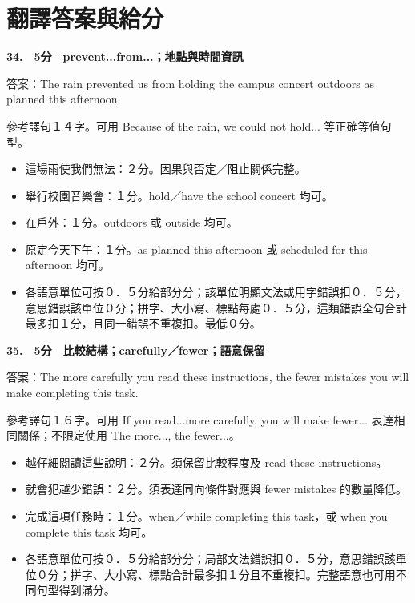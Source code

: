 \documentclass[11pt,a4paper]{article}
\begin{document}
\newpage
\section*{翻譯答案與給分}
\textbf{34.　5分　prevent...from...；地點與時間資訊}\par
答案：The rain prevented us from holding the campus concert outdoors as planned this afternoon.
\par\smallskip
參考譯句１４字。可用 Because of the rain, we could not hold... 等正確等值句型。
\par\smallskip
\begin{itemize}[leftmargin=1.3em,itemsep=2pt,topsep=1pt]
\item 這場雨使我們無法：２分。因果與否定／阻止關係完整。
\item 舉行校園音樂會：１分。hold／have the school concert 均可。
\item 在戶外：１分。outdoors 或 outside 均可。
\item 原定今天下午：１分。as planned this afternoon 或 scheduled for this afternoon 均可。
\item 各語意單位可按０．５分給部分分；該單位明顯文法或用字錯誤扣０．５分，意思錯誤該單位０分；拼字、大小寫、標點每處０．５分，這類錯誤全句合計最多扣１分，且同一錯誤不重複扣。最低０分。
\end{itemize}
\medskip
{}\textbf{35.　5分　比較結構；carefully／fewer；語意保留}\par
答案：The more carefully you read these instructions, the fewer mistakes you will make completing this task.
\par\smallskip
參考譯句１６字。可用 If you read...more carefully, you will make fewer... 表達相同關係；不限定使用 The more..., the fewer...。
\par\smallskip
\begin{itemize}[leftmargin=1.3em,itemsep=2pt,topsep=1pt]
\item 越仔細閱讀這些說明：２分。須保留比較程度及 read these instructions。
\item 就會犯越少錯誤：２分。須表達同向條件對應與 fewer mistakes 的數量降低。
\item 完成這項任務時：１分。when／while completing this task，或 when you complete this task 均可。
\item 各語意單位可按０．５分給部分分；局部文法錯誤扣０．５分，意思錯誤該單位０分；拼字、大小寫、標點合計最多扣１分且不重複扣。完整語意也可用不同句型得到滿分。
\end{itemize}
\medskip
\end{document}
